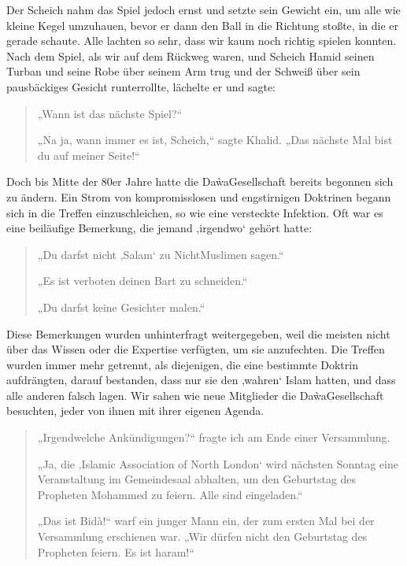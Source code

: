 \documentclass[12pt]{memoir}
\begin{document}
Der Scheich nahm das Spiel jedoch ernst
und setzte sein Gewicht ein, um alle wie kleine Kegel umzuhauen,
bevor er dann den Ball in die Richtung stoßte, in die er gerade schaute.
Alle lachten so sehr, dass wir kaum noch richtig spielen konnten.
Nach dem Spiel, als wir auf dem Rückweg waren,
und Scheich Hamid seinen Turban
und seine Robe über seinem Arm trug und der Schweiß
über sein pausbäckiges Gesicht runterrollte,
lächelte er und sagte:

\begin{quote}
„Wann ist das nächste Spiel?“

„Na ja, wann immer es ist, Scheich,“ sagte Khalid.
„Das nächste Mal bist du auf meiner Seite!“
\end{quote}

Doch bis Mitte der 80er Jahre hatte die Da\`wa\–Gesellschaft
bereits begonnen sich zu ändern.
Ein Strom von kompromisslosen und engstirnigen Doktrinen
begann sich in die Treffen einzuschleichen,
so wie eine versteckte Infektion.
Oft war es eine beiläufige Bemerkung, die jemand ‚irgendwo‘ gehört hatte:

\begin{quote}
„Du darfst nicht ‚Salam‘ zu Nicht\–Muslimen sagen.“

„Es ist verboten deinen Bart zu schneiden.“

„Du darfst keine Gesichter malen.“
\end{quote}

Diese Bemerkungen wurden unhinterfragt weitergegeben,
weil die meisten nicht über das Wissen oder die Expertise verfügten,
um sie anzufechten.
Die Treffen wurden immer mehr getrennt, als diejenigen,
die eine bestimmte Doktrin aufdrängten, darauf bestanden,
dass nur sie den ‚wahren‘ Islam hatten,
und dass alle anderen falsch lagen.
Wir sahen wie neue Mitglieder die Da\`wa\–Gesellschaft besuchten,
jeder von ihnen mit ihrer eigenen Agenda.

\begin{quote}
„Irgendwelche Ankündigungen?“ fragte ich am Ende einer Versammlung.

„Ja, die ‚Islamic Association of North London‘ wird nächsten Sonntag
eine Veranstaltung im Gemeindesaal abhalten,
um den Geburtstag des Propheten Mohammed zu feiern.
Alle sind eingeladen.“

„Das ist Bid\`a!“ warf ein junger Mann ein,
der zum ersten Mal bei der Versammlung erschienen war.
„Wir dürfen nicht den Geburtstag des Propheten feiern. Es ist haram!“
\end{quote}
\end{document}
